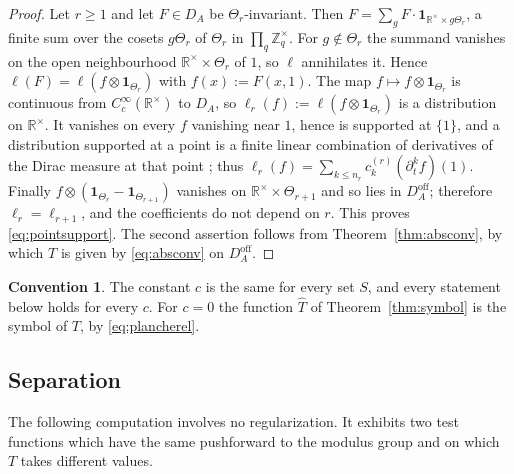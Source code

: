 \documentclass[11pt]{amsart}
\theoremstyle{definition}
\newtheorem{convention}[theorem]{Convention}
\theoremstyle{remark}
\newcommand{\R}{\mathbb R}
\newcommand{\Z}{\mathbb Z}
\newcommand{\Th}{\widehat{T}}
\newcommand{\DA}{D_A}
\begin{document}
\begin{proof}
Let $r\ge1$ and let $F\in\DA$ be $\Theta_r$-invariant.  Then
$F=\sum_{g}F\cdot\mathbf 1_{\R^{\times}\times g\Theta_r}$, a finite sum over
the cosets $g\Theta_r$ of $\Theta_r$ in $\prod_q\Z_q^{\times}$.  For
$g\notin\Theta_r$ the summand vanishes on the open neighbourhood
$\R^{\times}\times\Theta_r$ of $1$, so $\ell$ annihilates it.  Hence
$\ell(F)=\ell(f\otimes\mathbf 1_{\Theta_r})$ with $f(x):=F(x,1)$.  The map
$f\mapsto f\otimes\mathbf 1_{\Theta_r}$ is continuous from
$C_c^{\infty}(\R^{\times})$ to $\DA$, so
$\ell_r(f):=\ell(f\otimes\mathbf 1_{\Theta_r})$ is a distribution on
$\R^{\times}$.  It vanishes on every $f$ vanishing near $1$, hence is supported
at $\{1\}$, and a distribution supported at a point is a finite linear
combination of derivatives of the Dirac measure at that point
\cite[Theorem~2.3.4]{Hormander}; thus
$\ell_r(f)=\sum_{k\le n_r}c^{(r)}_k(\partial_t^{k}f)(1)$.  Finally
$f\otimes(\mathbf 1_{\Theta_r}-\mathbf 1_{\Theta_{r+1}})$ vanishes on
$\R^{\times}\times\Theta_{r+1}$ and so lies in $\DA^{\mathrm{off}}$; therefore
$\ell_r=\ell_{r+1}$, and the coefficients do not depend on $r$.  This proves
\eqref{eq:pointsupport}.  The second assertion follows from
Theorem~\ref{thm:absconv}, by which $T$ is given by \eqref{eq:absconv} on
$\DA^{\mathrm{off}}$.
\end{proof}

\begin{convention}\label{conv:c}
The constant $c$ is the same for every set $S$, and every statement below
holds for every $c$.  For $c=0$ the function
$\Th$ of Theorem~\ref{thm:symbol} is the symbol of $T$, by
\eqref{eq:plancherel}.
\end{convention}

\subsection{Separation}

The following computation involves no regularization.  It exhibits two test
functions which have the same pushforward to the modulus group and on which
$T$ takes different values.
\end{document}
